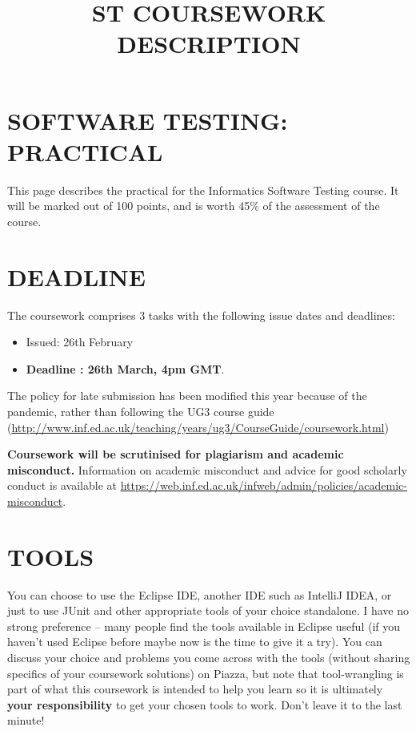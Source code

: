 \documentclass{article}
\title{ST COURSEWORK DESCRIPTION}
\begin{document}
\maketitle

\section{SOFTWARE TESTING: PRACTICAL}
This page describes the practical for the Informatics Software Testing
course. It will be marked out of 100 points, and is worth 45\% of the
assessment of the course.

\section{DEADLINE}
The coursework comprises 3 tasks with the following issue dates and
deadlines:

\begin{itemize}
\item Issued: 26th February
\item \textbf{Deadline : 26th March, 4pm GMT}.
\end{itemize}

The policy for late submission has been modified this year because of
the pandemic, rather than following the UG3 course guide
(\url{http://www.inf.ed.ac.uk/teaching/years/ug3/CourseGuide/coursework.html})

\textbf{Coursework will be scrutinised for plagiarism and academic
  misconduct.} Information on academic misconduct and advice for good
scholarly conduct is available at
\url{https://web.inf.ed.ac.uk/infweb/admin/policies/academic-misconduct}.


\section{TOOLS}

You can choose to use the Eclipse IDE, another IDE such as IntelliJ
IDEA, or just to use JUnit and other appropriate tools of your choice
standalone. I have no strong preference -- many people find the tools
available in Eclipse useful (if you haven't used Eclipse before maybe
now is the time to give it a try). You can discuss your choice and
problems you come across with the tools (without sharing specifics of
your coursework solutions) on Piazza, but note that tool-wrangling is
part of what this coursework is intended to help you learn so it is
ultimately \textbf{your responsibility} to get your chosen tools to
work. Don't leave it to the last minute!
\end{document}
